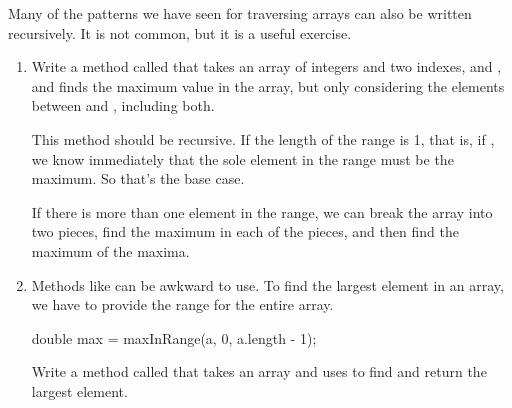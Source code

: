 \begin{exercise}  %

Many of the patterns we have seen for traversing arrays can also be written recursively.
It is not common, but it is a useful exercise.

\begin{enumerate}

\item Write a method called  that takes an array of integers and two indexes,  and , and finds the maximum value in the array, but only considering the elements between  and , including both.

This method should be recursive.
If the length of the range is 1, that is, if , we know immediately that the sole element in the range must be the maximum.
So that's the base case.

If there is more than one element in the range, we can break the array into two pieces, find the maximum in each of the pieces, and then find the maximum of the maxima.

\item Methods like  can be awkward to use.
To find the largest element in an array, we have to provide the range for the entire array.

\begin{code}
double max = maxInRange(a, 0, a.length - 1);
\end{code}

Write a method called  that takes an array and uses  to find and return the largest element.

\end{enumerate}

\end{exercise}

